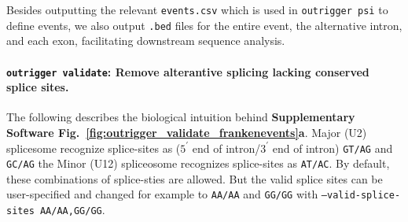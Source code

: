 Besides outputting the relevant \texttt{events.csv} which is used in \texttt{outrigger psi} to define events, we also output \texttt{.bed} files for the entire event, the alternative intron, and each exon, facilitating downstream sequence analysis.





\paragraph{\texttt{outrigger validate}: Remove alterantive splicing lacking conserved splice sites.} The following describes the biological intuition behind \textbf{Supplementary Software Fig.~\ref{fig:outrigger_validate_frankenevents}a}. Major (U2) splicesome recognize splice-sites as  ($5^\prime$ end of intron/$3^\prime$ end of intron) \texttt{GT/AG} and \texttt{GC/AG} the Minor (U12) spliceosome recognizes splice-sites as \texttt{AT/AC}\cite{McManus:2011en,GarciaBlanco:2004kl}. By default, these combinations of splice-sties are allowed. But the valid splice sites can be user-specified and changed for example to \texttt{AA/AA} and \texttt{GG/GG} with \texttt{--valid-splice-sites~AA/AA,GG/GG}.

